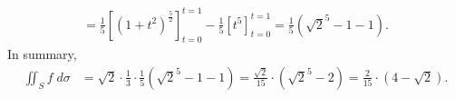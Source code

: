 \documentclass[11pt]{article}
\begin{document}
\begin{solution}
\begin{align*}
        =
        \frac 1 5
        \left[ \left( 1 + t^2 \right)^{\frac 5 2} \right]_{t=0}^{t=1}
        -
        \frac 1 5
        \left[ t^5 \right]_{t=0}^{t=1}
        =
        \frac 1 5 \left( \sqrt{2}^{5} - 1 - 1 \right)
        .
    \end{align*}
    In summary, 
    \begin{align*}
        \iint_S f \;d\sigma
        &=
        \sqrt{2}
        \cdot 
        \frac 1 3 
        \cdot 
        \frac 1 5 \left( \sqrt{2}^{5} - 1 - 1 \right)
        =
        \frac{\sqrt 2}{15}
        \cdot 
        \left( \sqrt{2}^{5} - 2 \right)
        =
        \frac{2}{15}
        \cdot 
        \left( 4 - \sqrt 2 \right)
        .
    \end{align*}
\end{solution}
\end{document}
